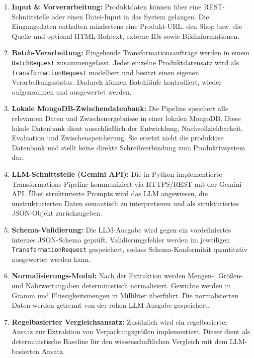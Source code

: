 \documentclass[11pt,a4paper]{article}
\begin{document}
\begin{enumerate}
    \item \textbf{Input \& Vorverarbeitung:} Produktdaten können über eine REST-Schnittstelle oder einen Datei-Input in das System gelangen. Die Eingangsdaten enthalten mindestens eine Produkt-URL, den Shop bzw. die Quelle und optional HTML-Rohtext, externe IDs sowie Bildinformationen.
    
    \item \textbf{Batch-Verarbeitung:} Eingehende Transformationsaufträge werden in einem \texttt{BatchRequest} zusammengefasst. Jeder einzelne Produktdatensatz wird als \texttt{TransformationRequest} modelliert und besitzt einen eigenen Verarbeitungsstatus. Dadurch können Batchläufe kontrolliert, wieder aufgenommen und ausgewertet werden.
    
    \item \textbf{Lokale MongoDB-Zwischendatenbank:} Die Pipeline speichert alle relevanten Daten und Zwischenergebnisse in einer lokalen MongoDB. Diese lokale Datenbank dient ausschließlich der Entwicklung, Nachvollziehbarkeit, Evaluation und Zwischenspeicherung. Sie ersetzt nicht die produktive Datenbank und stellt keine direkte Schreibverbindung zum Produktivsystem dar.
    
    \item \textbf{LLM-Schnittstelle (Gemini API):} Die in Python implementierte Transformations-Pipeline kommuniziert via HTTPS/REST mit der Gemini API. Über strukturierte Prompts wird das LLM angewiesen, die unstrukturierten Daten semantisch zu interpretieren und als strukturiertes JSON-Objekt zurückzugeben.
    
    \item \textbf{Schema-Validierung:} Die LLM-Ausgabe wird gegen ein vordefiniertes internes JSON-Schema geprüft. Validierungsfehler werden im jeweiligen \texttt{TransformationRequest} gespeichert, sodass Schema-Konformität quantitativ ausgewertet werden kann.
    
    \item \textbf{Normalisierungs-Modul:} Nach der Extraktion werden Mengen-, Größen- und Nährwertangaben deterministisch normalisiert. Gewichte werden in Gramm und Flüssigkeitsmengen in Milliliter überführt. Die normalisierten Daten werden getrennt von der rohen LLM-Ausgabe gespeichert.
    
    \item \textbf{Regelbasierter Vergleichsansatz:} Zusätzlich wird ein regelbasierter Ansatz zur Extraktion von Verpackungsgrößen implementiert. Dieser dient als deterministische Baseline für den wissenschaftlichen Vergleich mit dem LLM-basierten Ansatz.
    

\end{enumerate}
\end{document}
